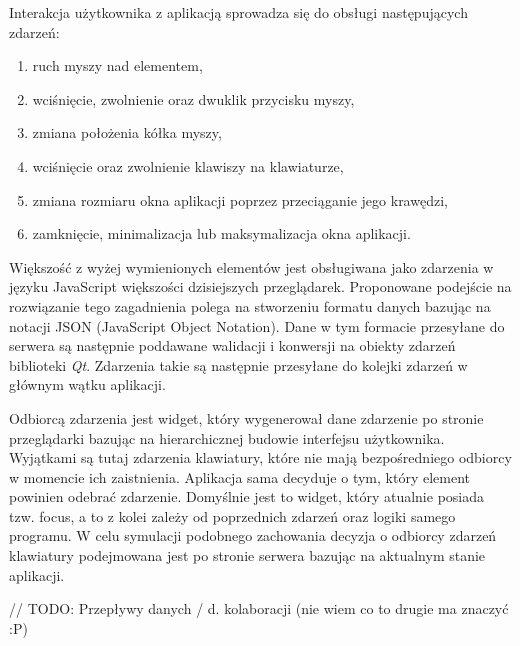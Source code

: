 Interakcja użytkownika z aplikacją sprowadza się do obsługi następujących zdarzeń:
\begin{enumerate}
  \item ruch myszy nad elementem,
  \item wciśnięcie, zwolnienie oraz dwuklik przycisku myszy,
  \item zmiana położenia kółka myszy,
  \item wciśnięcie oraz zwolnienie klawiszy na klawiaturze,
  \item zmiana rozmiaru okna aplikacji poprzez przeciąganie jego krawędzi,
  \item zamknięcie, minimalizacja lub maksymalizacja okna aplikacji.
\end{enumerate}
Większość z wyżej wymienionych elementów jest obsługiwana jako zdarzenia w języku JavaScript większości dzisiejszych przeglądarek. Proponowane podejście na rozwiązanie tego zagadnienia polega na stworzeniu formatu danych bazując na notacji JSON (JavaScript Object Notation). Dane w tym formacie przesyłane do serwera są następnie poddawane walidacji i konwersji na obiekty zdarzeń biblioteki \emph{Qt}. Zdarzenia takie są następnie przesyłane do kolejki zdarzeń w głównym wątku aplikacji.

Odbiorcą zdarzenia jest widget, który wygenerował dane zdarzenie po stronie przeglądarki bazując na hierarchicznej budowie interfejsu użytkownika. Wyjątkami są tutaj zdarzenia klawiatury, które nie mają bezpośredniego odbiorcy w momencie ich zaistnienia. Aplikacja sama decyduje o tym, który element powinien odebrać zdarzenie. Domyślnie jest to widget, który atualnie posiada tzw. focus, a to z kolei zależy od poprzednich zdarzeń oraz logiki samego programu. W celu symulacji podobnego zachowania decyzja o odbiorcy zdarzeń klawiatury podejmowana jest po stronie serwera bazując na aktualnym stanie aplikacji.

// TODO: Przepływy danych / d. kolaboracji (nie wiem co to drugie ma znaczyć :P)